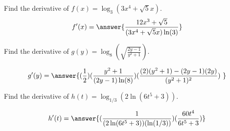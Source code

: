\documentclass{ximera}
\author{Bobby Ramsey}
\begin{document}
\begin{exercise}
	Find the derivative of $\displaystyle f(x) = \log_{3}(3x^4+\sqrt{5}x)$.
	\[ f'(x) = \answer{ \frac{12x^3+\sqrt{5}}{(3x^4+\sqrt{5}x)\ln(3)} }\]
\end{exercise}

\begin{exercise}
	Find the derivative of $\displaystyle g(y) = \log_8\left( \sqrt{\frac{2y-1}{y^2+1}} \right)$.

	\[ g'(y) = \answer{ (\frac{1}{2}) (\frac{y^2+1}{(2y-1)\ln(8)}) (\frac{(2)(y^2+1)-(2y-1)(2y)}{(y^2+1)^2})\  }\]
\end{exercise}

\begin{exercise}
	Find the derivative of $\displaystyle h(t) = \log_{1/3}\left( 2\ln\left( 6t^5 + 3\right)\right)$.
	
	\[ h'(t) = \answer{   (\frac{1}{(2\ln( 6t^5 + 3))(\ln(1/3))}) (\frac{60t^4}{6t^5+3})  }\]
\end{exercise}
\end{document}
